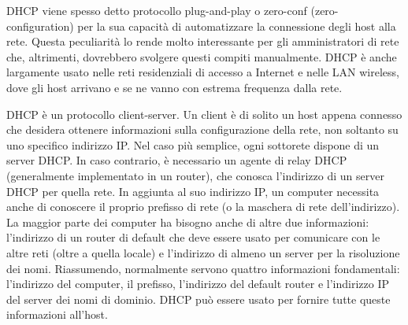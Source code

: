 DHCP viene spesso detto protocollo plug-and-play o zero-conf (zero-configuration) per la sua capacità di automatizzare la connessione degli host alla rete. Questa peculiarità lo rende molto interessante per gli amministratori di rete che, altrimenti, dovrebbero svolgere questi compiti manualmente. DHCP è anche largamente usato nelle reti residenziali di accesso a Internet e nelle LAN wireless, dove gli host arrivano e se ne vanno con estrema frequenza dalla rete.

DHCP è un protocollo client-server. Un client è di solito un host appena connesso che desidera ottenere informazioni sulla configurazione della rete, non soltanto su uno specifico indirizzo IP. Nel caso più semplice, ogni sottorete dispone di un server DHCP. In caso contrario, è necessario un agente di relay DHCP (generalmente implementato in un router), che conosca l'indirizzo di un server DHCP per quella rete.
In aggiunta al suo indirizzo IP, un computer necessita anche di conoscere il proprio prefisso di rete (o la maschera di rete dell'indirizzo). La maggior parte dei computer ha bisogno anche di altre due informazioni: l'indirizzo di un router di default che deve essere usato per comunicare con le altre reti (oltre a quella locale) e l'indirizzo di almeno un server per la risoluzione dei nomi. Riassumendo, normalmente servono quattro informazioni fondamentali: l'indirizzo del computer, il prefisso, l'indirizzo del default router e l'indirizzo IP del server dei nomi di dominio. DHCP può essere usato per fornire tutte queste informazioni all'host.


